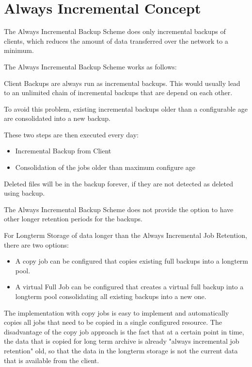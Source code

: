 \section{Always Incremental Concept}

The Always Incremental Backup Scheme does only incremental backups of clients,
which reduces the amount of data transferred over the network to a minimum.


The Always Incremental Backup Scheme works as follows:

Client Backups are always run as incremental backups.
This would usually lead to an unlimited chain of incremental backups that are depend on each other.

To avoid this problem, existing incremental backups older than a configurable age are consolidated into a new backup.

These two steps are then executed every day:

\begin{itemize}
    \item Incremental Backup from Client
    \item Consolidation of the jobs older than maximum configure age
\end{itemize}

Deleted files will be in the backup forever, if they are not detected as deleted using  backup.

The Always Incremental Backup Scheme does not provide the option to have other longer retention
periods for the backups.

For Longterm Storage of data longer than the Always Incremental Job Retention, there are two options:

\begin{itemize}
    \item A copy job can be configured that copies existing full backups into a longterm pool.
    \item A virtual Full Job can be configured that creates a virtual full backup into a longterm pool consolidating all existing backups into a new one.
\end{itemize}

The implementation with copy jobs is easy to implement and automatically copies all jobs that need to be copied in a single configured resource.
The disadvantage of the copy job approach is the fact that at a certain point in time, the data that is copied for long term archive is already "always incremental job retention" old, so that the data in the longterm storage is not the current data that is available from the client.

